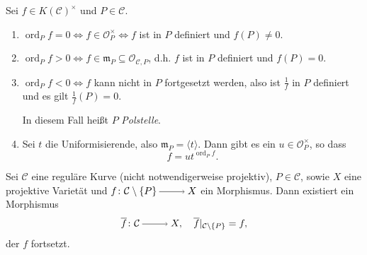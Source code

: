 \documentclass[a4paper,12pt,index=toc]{scrbook}
\theoremstyle{keinenummern} %
\def\CC{\mathcal{C}}
\def\O{\mathcal{O}}
\def\m{\mathfrak{m}}
\newcommand{\ord}{\operatorname{ord}}
\newcommand{\restrict}[1]{|_{#1}}
\def\Bar#1{\ensuremath\overline{#1}}
\begin{document}
\begin{db}\label{4.1.5}
Sei $f\in K(\CC)^{\times}$ und $P\in\CC$.
\begin{enumerate}
\item $\ord_{P}f = 0\iff f\in\O_{P}^{\times}\iff f$ ist in $P$ definiert und $f(P)\neq 0$.
\item $\ord_{P}f>0\iff f\in\m_{P}\subseteq\O_{\CC,P}$, d.h. $f$ ist in $P$ definiert und $f(P)=0$.
\item \mbox{$\ord_{P}f<0 \iff f$} kann nicht in $P$ fortgesetzt werden, also ist $\frac{1}{f}$ in $P$ definiert und es gilt $\frac{1}{f}(P)=0$.

In diesem Fall heißt $P$ \emph{Polstelle}.
\item Sei $t$ die Uniformisierende, also $\m_{P}=\langle t\rangle$. Dann gibt es ein $u\in\O_{P}^{\times}$, so dass
\begin{equation*}f=ut^{\ord_{P}f}.\end{equation*}
\end{enumerate}\end{db}

\begin{prop}\label{4.1.6}
Sei $\CC$ eine reguläre Kurve (nicht notwendigerweise projektiv), $P\in\CC$, sowie $X$ eine projektive Varietät und $f\colon \CC\setminus\{P\}\ra X$ ein Morphismus. Dann existiert ein Morphismus
\begin{equation*}\Bar{f}\colon \CC\ra X,\quad \Bar{f}\restrict{\CC\setminus\{P\}}=f,\end{equation*}
der $f$ fortsetzt.
\end{prop}
\end{document}
